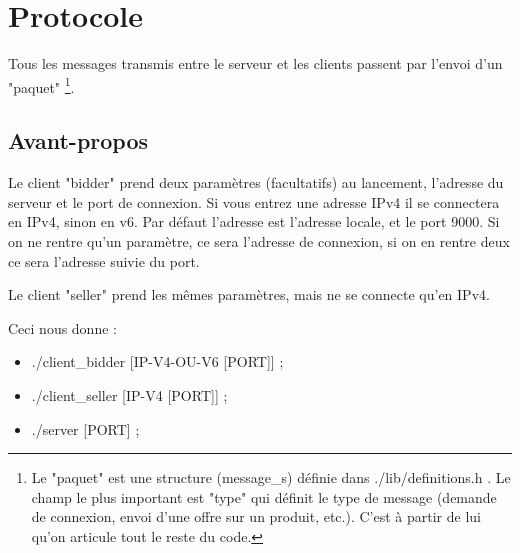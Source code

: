 \section{Protocole}
Tous les messages transmis entre le serveur et les clients passent par l'envoi d'un "paquet"
\protect\footnote{
	Le "paquet" est une structure (message\_s) définie dans ./lib/definitions.h . 
	Le champ le plus important est "type" qui définit le type de message 
	(demande de connexion, envoi d'une offre sur un produit, etc.).
	C'est à partir de lui qu'on articule tout le reste du code.
}.
\subsection{Avant-propos}
Le client "bidder" prend deux paramètres (facultatifs) au lancement,
l'adresse du serveur et le port de connexion.
Si vous entrez une adresse IPv4 il se connectera en IPv4, sinon en v6.
Par défaut l'adresse est l'adresse locale, et le port 9000.
Si on ne rentre qu'un paramètre, ce sera l'adresse de connexion, 
   si on en rentre deux ce sera l'adresse suivie du port.

Le client "seller" prend les mêmes paramètres, mais ne se connecte qu'en IPv4.

Ceci nous donne :
\begin{itemize}
\item ./client\_bidder [IP-V4-OU-V6 [PORT]] ;
\item ./client\_seller [IP-V4 [PORT]] ;
\item ./server [PORT] ;
\end{itemize}


